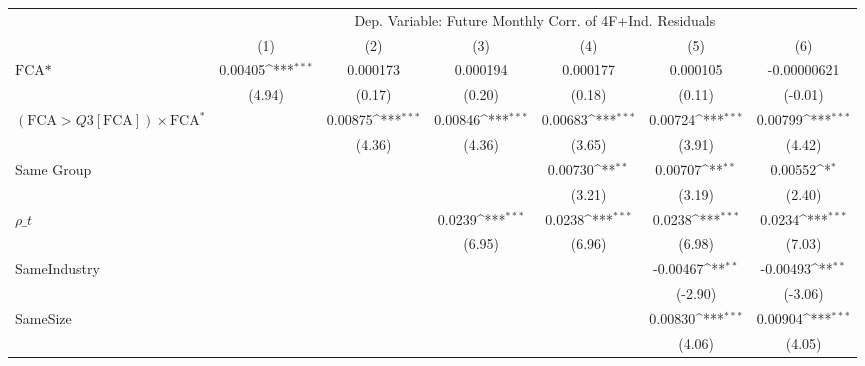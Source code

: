 {
\def\sym#1{\ifmmode^{#1}\else\(^{#1}\)\fi}
\begin{tabular}{l*{6}{c}}
\hline\hline
                &\multicolumn{6}{c}{Dep. Variable: Future Monthly Corr. of 4F+Ind. Residuals}                                     \\\cmidrule(lr){2-7}
                &\multicolumn{1}{c}{(1)}         &\multicolumn{1}{c}{(2)}         &\multicolumn{1}{c}{(3)}         &\multicolumn{1}{c}{(4)}         &\multicolumn{1}{c}{(5)}         &\multicolumn{1}{c}{(6)}         \\
\hline
$ \text{FCA*} $ &  0.00405\sym{***}& 0.000173         & 0.000194         & 0.000177         & 0.000105         &-0.00000621         \\
                &   (4.94)         &   (0.17)         &   (0.20)         &   (0.18)         &   (0.11)         &  (-0.01)         \\
[1em]
 $ (\text{FCA} > Q3[\text{FCA}]) \times {\text{FCA} ^*}  $ &                  &  0.00875\sym{***}&  0.00846\sym{***}&  0.00683\sym{***}&  0.00724\sym{***}&  0.00799\sym{***}\\
                &                  &   (4.36)         &   (4.36)         &   (3.65)         &   (3.91)         &   (4.42)         \\
[1em]
Same Group      &                  &                  &                  &  0.00730\sym{**} &  0.00707\sym{**} &  0.00552\sym{*}  \\
                &                  &                  &                  &   (3.21)         &   (3.19)         &   (2.40)         \\
[1em]
 $ {\rho\_t} $   &                  &                  &   0.0239\sym{***}&   0.0238\sym{***}&   0.0238\sym{***}&   0.0234\sym{***}\\
                &                  &                  &   (6.95)         &   (6.96)         &   (6.98)         &   (7.03)         \\
[1em]
SameIndustry    &                  &                  &                  &                  & -0.00467\sym{**} & -0.00493\sym{**} \\
                &                  &                  &                  &                  &  (-2.90)         &  (-3.06)         \\
[1em]
SameSize        &                  &                  &                  &                  &  0.00830\sym{***}&  0.00904\sym{***}\\
                &                  &                  &                  &                  &   (4.06)         &   (4.05)         \\

\end{tabular}}
